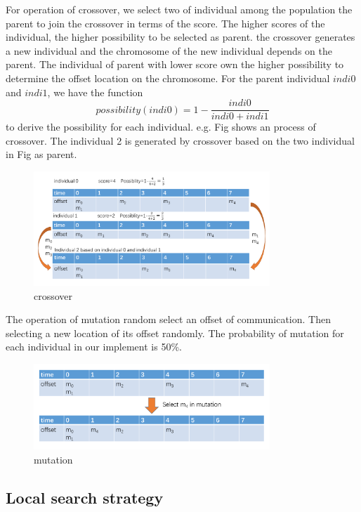 \documentclass[conference]{IEEEtran}
\begin{document}
For operation of crossover, we select two of individual among the population the parent to join the crossover in terms of the score. The higher scores of the individual, the higher possibility to be selected as parent. the crossover generates a new individual and the chromosome of the new individual depends on the parent. The individual of parent with lower score own the higher possibility to determine the offset location on the chromosome. For the parent individual $indi0$ and $indi1$, we have the function
\begin{equation}
	possibility(indi0)=1-\frac{indi0}{indi0+indi1}
\end{equation}
to derive the possibility for each individual. e.g. Fig shows an process of crossover. The individual 2 is generated by crossover based on the two individual in Fig as parent.
\begin{figure}[!t]
	\centering
	\includegraphics[width=3.5in]{picture/crossover.pdf}
	\caption{crossover}
	\label{crossover}
\end{figure}

The operation of mutation random select an offset of communication. Then selecting a new location of its offset randomly. The probability of mutation for each individual in our implement is 50\%.
\begin{figure}[!t]
	\centering
	\includegraphics[width=3.5in]{picture/mutation.pdf}
	\caption{mutation}
	\label{mutation}
\end{figure}

\subsection{Local search strategy}
\end{document}
